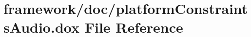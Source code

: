 \hypertarget{platform_constraints_audio_8dox}{}\section{framework/doc/platform\+Constraints\+Audio.dox File Reference}
\label{platform_constraints_audio_8dox}
